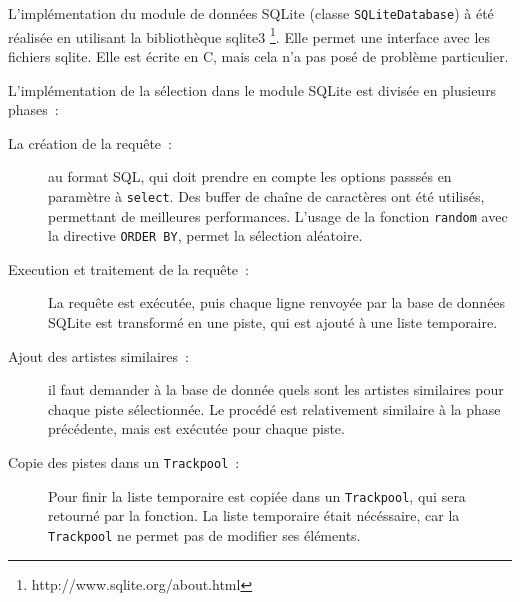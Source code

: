 L’implémentation du module de données SQLite (classe \texttt{SQLiteDatabase})
à été réalisée en utilisant la bibliothèque sqlite3
\footnote{http://www.sqlite.org/about.html}. Elle permet une interface avec les
fichiers sqlite. Elle est écrite en C, mais cela n'a pas posé de problème
particulier.

L’implémentation de la sélection dans le module SQLite est divisée en plusieurs
phases~:
\begin{description}
  \item[La création de la requête~:] au format SQL, qui doit prendre en compte
  les options passsés en paramètre à \texttt{select}. Des buffer de chaîne de
  caractères ont été utilisés, permettant de meilleures performances. L'usage de
  la fonction \texttt{random} avec la directive \texttt{ORDER BY}, permet la
  sélection aléatoire.

  \item[Execution et traitement de la requête~:] La requête est exécutée, puis
  chaque ligne renvoyée par la base de données SQLite est transformé en une
  piste, qui est ajouté à une liste temporaire.

  \item[Ajout des artistes similaires~:] il faut demander à la base de donnée
  quels sont les artistes similaires pour chaque piste sélectionnée. Le procédé
  est relativement similaire à la phase précédente, mais est exécutée pour
  chaque piste.

  \item[Copie des pistes dans un \texttt{Trackpool}~:] Pour finir la liste
  temporaire est copiée dans un \texttt{Trackpool}, qui sera retourné par la
  fonction. La liste temporaire était nécéssaire, car la \texttt{Trackpool} ne
  permet pas de modifier ses éléments.
\end{description}
